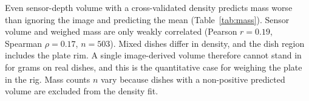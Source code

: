 Even sensor-depth volume with a cross-validated density predicts mass worse
than ignoring the image and predicting the mean (Table~\ref{tab:mass}).
Sensor volume and weighed mass are only weakly correlated (Pearson $r=0.19$,
Spearman $\rho=0.17$, $n=503$). Mixed dishes differ in density, and the
dish region includes the plate rim. A single image-derived volume therefore
cannot stand in for grams on real dishes, and this is the quantitative case for
weighing the plate in the rig. Mass counts $n$ vary because dishes with a
non-positive predicted volume are excluded from the density fit.
